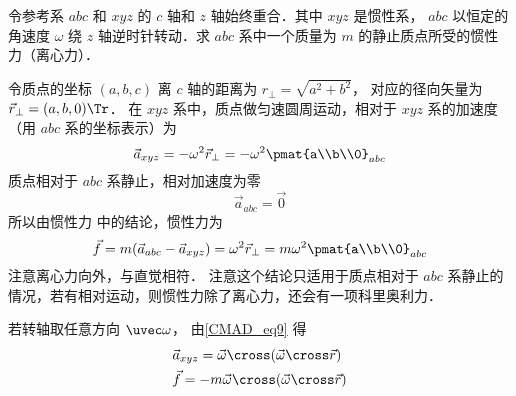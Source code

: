 
令参考系 $abc$ 和 $xyz$ 的 $c$ 轴和 $z$ 轴始终重合．其中 $xyz$ 是惯性系， $abc$ 以恒定的角速度 $\omega$ 绕 $z$ 轴逆时针转动．求 $abc$ 系中一个质量为 $m$ 的静止质点所受的惯性力（离心力）．

令质点的坐标 $(a,b,c)$ 离 $c$ 轴的距离为 $r_\bot = \sqrt{a^2 + b^2}$， 对应的径向矢量为 $\vec r_\bot = (a,b,0)\Tr$． 在 $xyz$ 系中，质点做匀速圆周运动，相对于 $xyz$ 系的加速度（用 $abc$ 系的坐标表示）为
\begin{equation}
\vec a_{xyz} =  - \omega ^2 \vec r_\bot =  - \omega ^2 \pmat{a\\b\\0}_{abc}
\end{equation}
质点相对于 $abc$ 系静止，相对加速度为零
\begin{equation}
\vec a_{abc} = \vec 0
\end{equation}
所以由惯性力 中的结论，惯性力为
\begin{equation}\label{Centri_eq3}
\vec f = m(\vec a_{abc} - \vec a_{xyz}) = \omega^2\vec r_\bot = m\omega ^2\pmat{a\\b\\0}_{abc}
\end{equation}
注意离心力向外，与直觉相符． 注意这个结论只适用于质点相对于 $abc$ 系静止的情况，若有相对运动，则惯性力除了离心力，还会有一项科里奥利力．

若转轴取任意方向 $\uvec\omega$， 由\autoref{CMAD_eq9} 得
\begin{align}
&\vec a_{xyz} = \vec\omega\cross (\vec\omega\cross\vec r)\\
&\vec f = -m\vec\omega\cross (\vec\omega\cross\vec r)\label{Centri_eq5}
\end{align}